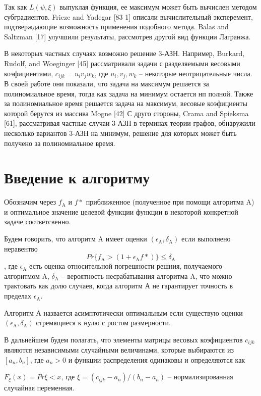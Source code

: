 Так как $L(\psi, \xi)$ выпуклая функция, ее максимум может быть вычислен методом субградиентов. 
Frieze and Yadegar [83 1] описали вычислительный эксперемент, подтверждающие возможность применения подобного метода.
Balas and Saltzman [17] улучшили результаты, рассмотрев другой вид функции Лагранжа. 

В некоторых частных случаях возможно решение 3-АЗН. Например,  Burkard, Rudolf, and Woeginger [45] рассматривали задачи с разделяемыми весовыми коэфициентами, $c_{ijk}=u_iv_jw_k$, где $u_i, v_j, w_k$ -- некоторые неотрицательные числа. В своей работе они показали, что задача на максимум решается за полиномиальное время, тогда как задача на минимум остается нп полной.  Также за полиномиальное время решается задача на максимум, весовые коэфициенты которой берутся из массива Mogne  [42]
С друго стороны, Crama and Spieksma [61], рассматривая частные случаи 3-АЗН в терминах теории графов, обнаружили несколько вариантов 3-АЗН на минимум, решение для которых может быть получено за полиномиальное время. 

\section{Введение к алгоритму}

Обозначим через $f_{\mathrm{A}}$ и $f*$ приближенное (полученное при помощи алгоритма $\mathrm{A}$) 
и оптимальное значение целевой функции функции в некоторой конкретной задаче соответсвенно.

Будем говорить, что алгоритм  $\mathrm{A}$ имеет оценки $(\epsilon_{\mathrm{A}}, \delta_{\mathrm{A}})$
если выполнено неравентво 
\[
Pr \{ f_{\mathrm{A}} > (1+ \epsilon_{\mathrm{A}} f* )\} \leq \delta_{\mathrm{A}}
\],
где $\epsilon_{\mathrm{A}}$ есть оценка относительной погрешности решния, получаемого алгоритмом ${\mathrm{A}}$,
$\delta_{\mathrm{A}}$ -- вероятность несрабатывания алгоритма ${\mathrm{A}}$, что можно трактовать как долю случаев, когда алгоритм А не гарантирует точность в пределах $\epsilon_{\mathrm{A}}$.

Алгоритм А назвается асимптотически оптимальным если существую оценки $(\epsilon_{\mathrm{A}}, \delta_{\mathrm{A}})$
стремящиеся к нулю с ростом размерности. 

В дальнейшем будем полагать, что элементы матрицы весовых коэфициентов $c_{ijk}$ являются независимыми случайными величинами,  которые выбираются из $[a_n, b_n]$, где $a_n > 0$ и функции распределения одинаковы и определяются как

$
F_{\xi} (x) = Pr{\xi < x} 
$, где $\xi = (c_{ijk} - a_n ) / (b_n - a_n)$ -- нормализированная случайная переменная.

